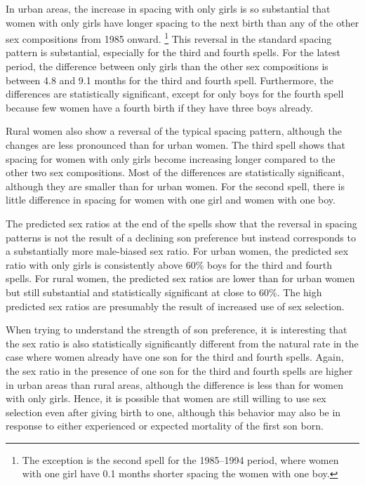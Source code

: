 \documentclass[12pt,letterpaper]{article}
\begin{document}
In urban areas, the increase in spacing with only girls is so 
substantial that women with only girls have longer spacing to the 
next birth than any of the other sex compositions from 1985 onward.%
\footnote{
The exception is the second spell for the 1985--1994 period, where women
with one girl have 0.1 months shorter spacing the women with one boy.
}
This reversal in the standard spacing pattern is substantial, 
especially for the third and fourth spells.
For the latest period, the difference between only girls than the
other sex compositions is between 4.8 and 9.1 months for the third
and fourth spell.
Furthermore, the differences are statistically significant, except
for only boys for the fourth spell because few women have a fourth
birth if they have three boys already.


Rural women also show a reversal of the typical spacing pattern,
although the changes are less pronounced than for urban women.
The third spell shows that spacing for women with only girls become
increasing longer compared to the other two sex compositions.
Most of the differences are statistically significant, although they are 
smaller than for urban women.
For the second spell, there is little difference in spacing for
women with one girl and women with one boy.

The predicted sex ratios at the end of the spells show that
the reversal in spacing patterns is not the result of a declining son
preference but instead corresponds to a substantially more male-biased 
sex ratio.
For urban women, the predicted sex ratio with only girls 
is consistently above 60\% boys for the third and fourth spells.
For rural women, the predicted sex ratios are lower than for urban
women but still substantial and statistically significant at close 
to 60\%.
The high predicted sex ratios are presumably the result of increased 
use of sex selection.

When trying to understand the strength of son preference, it is interesting
that the sex ratio is also statistically significantly different
from the natural rate in the case where women already have one
son for the third and fourth spells.
Again, the sex ratio in the presence of one son for the third and
fourth spells are higher in urban areas than rural areas, although
the difference is less than for women with only girls.
Hence, it is possible that women are still willing to use sex selection
even after giving birth to one, although this behavior may also 
be in response to either experienced
or expected mortality of the first son born.
\end{document}
